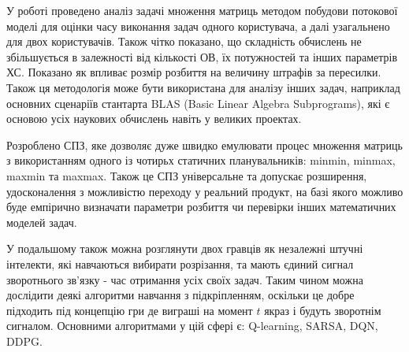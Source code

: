 
У роботі проведено аналіз задачі множення матриць методом побудови потокової моделі для оцінки часу виконання задач одного користувача, а далі узагальнено для двох користувачів. Також чітко показано, що складність обчислень не збільшується в залежності від кількості ОВ, їх потужностей та інших параметрів ХС. Показано як впливає розмір розбиття на величину штрафів за пересилки. Також ця методологія може бути використана для аналізу інших задач, наприклад основних сценаріїв стантарта BLAS (Basic Linear Algebra Subprograms), які є основою усіх наукових обчислень навіть у великих проектах.

Розроблено СПЗ, яке дозволяє дуже швидко емулювати процес множення матриць з використанням одного із чотирьх статичних планувальників: minmin, minmax, maxmin та maxmax. Також це СПЗ універсальне та допускає розширення, удосконалення з можливістю переходу у реальний продукт, на базі якого можливо буде емпірично визначати параметри розбиття чи перевірки інших математичних моделей задач.

У подальшому також можна розглянути двох гравців як незалежні штучні інтелекти, які навчаються вибирати розрізання, та мають єдиний сигнал зворотнього зв'язку - час отримання усіх своїх задач. Таким чином можна дослідити деякі алгоритми навчання з підкріпленням, оскільки це добре підходить під концепцію гри де виграші на момент $t$ якраз і будуть зворотнім сигналом. Основними алгоритмами у цій сфері є: Q-learning, SARSA, DQN, DDPG.